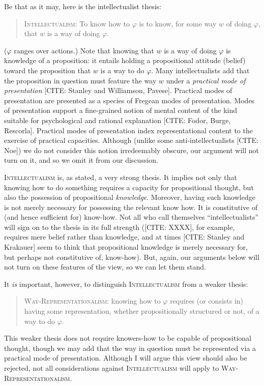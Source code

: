 Be that as it may, here is the intellectualist thesis:
\begin{quote}
	\textsc{Intellectualism:} To know how to $\varphi$ is to know, for some way $w$ of doing $\varphi$, that $w$ is a way of doing $\varphi$.
\end{quote}
($\varphi$ ranges over actions.)
Note that knowing that $w$ is a way of doing $\varphi$ is knowledge of a proposition: it entails holding a propositional attitude (belief) toward the proposition that $w$ is a way to do $\varphi$.
Many intellectualists add that the proposition in question must feature the way $w$ under a \emph{practical mode of presentation} [CITE: Stanley and Williamson, Pavese].
Practical modes of presentation are presented as a species of Fregean modes of presentation.
Modes of presentation support a fine-grained notion of mental content of the kind suitable for psychological and rational explanation [CITE: Fodor, Burge, Rescorla].
Practical modes of presentation index representational content to the exercise of practical capacities.
Although (unlike some anti-intellectualists [CITE: Noe]) we do not consider this notion irredeemably obscure, our argument will not turn on it, and so we omit it from our discussion.

\textsc{Intellectualism} is, as stated, a very strong thesis.
It implies not only that knowing how to do something requires a capacity for propositional thought, but also the possession of propositional \emph{knowledge}.
Moreover, having such knowledge is not merely necessary for possessing the relevant know how.
It is constitutive of (and hence sufficient for) know-how.
Not all who call themselves ``intellectualists'' will sign on to the thesis in its full strength ([CITE: XXXX], for example, requires mere belief rather than knowledge, and at times [CITE: Stanley and Krakauer] seem to think that propositional knowledge is merely necessary for, but perhaps not constitutive of, know-how).
But, again, our arguments below will not turn on these features of the view, so we can let them stand.

It \emph{is} important, however, to distinguish \textsc{Intellectualism} from a weaker thesis: 
\begin{quote}
	\textsc{Way-Representationalism:} knowing how to $\varphi$ requires (or consists in) having some representation, whether propositionally structured or not, of a way to do $\varphi$.
\end{quote}
This weaker thesis does not require knowers-how to be capable of propositional thought, though we may add that the way in question must be represented via a practical mode of presentation.
Although I will argue this view should also be rejected, not all considerations against \textsc{Intellectualism} will apply to \textsc{Way-Representationalism}.

